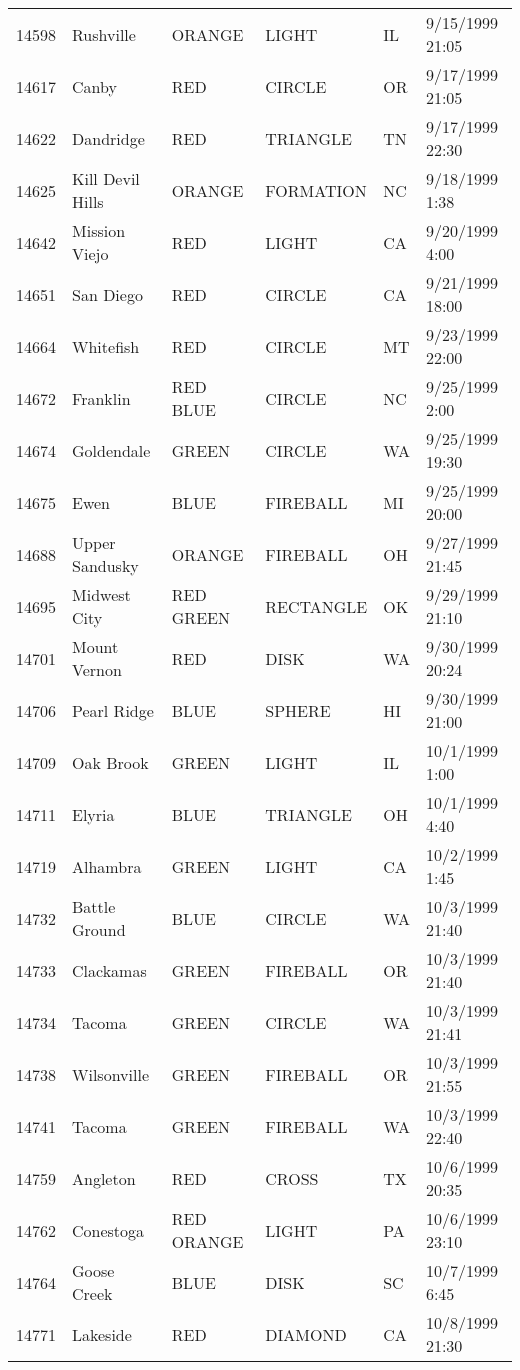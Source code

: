 \begin{tabular}{llllll}
14598 & Rushville & ORANGE & LIGHT & IL & 9/15/1999 21:05 \\
14617 & Canby & RED & CIRCLE & OR & 9/17/1999 21:05 \\
14622 & Dandridge & RED & TRIANGLE & TN & 9/17/1999 22:30 \\
14625 & Kill Devil Hills & ORANGE & FORMATION & NC & 9/18/1999 1:38 \\
14642 & Mission Viejo & RED & LIGHT & CA & 9/20/1999 4:00 \\
14651 & San Diego & RED & CIRCLE & CA & 9/21/1999 18:00 \\
14664 & Whitefish & RED & CIRCLE & MT & 9/23/1999 22:00 \\
14672 & Franklin & RED BLUE & CIRCLE & NC & 9/25/1999 2:00 \\
14674 & Goldendale & GREEN & CIRCLE & WA & 9/25/1999 19:30 \\
14675 & Ewen & BLUE & FIREBALL & MI & 9/25/1999 20:00 \\
14688 & Upper Sandusky & ORANGE & FIREBALL & OH & 9/27/1999 21:45 \\
14695 & Midwest City & RED GREEN & RECTANGLE & OK & 9/29/1999 21:10 \\
14701 & Mount Vernon & RED & DISK & WA & 9/30/1999 20:24 \\
14706 & Pearl Ridge & BLUE & SPHERE & HI & 9/30/1999 21:00 \\
14709 & Oak Brook & GREEN & LIGHT & IL & 10/1/1999 1:00 \\
14711 & Elyria & BLUE & TRIANGLE & OH & 10/1/1999 4:40 \\
14719 & Alhambra & GREEN & LIGHT & CA & 10/2/1999 1:45 \\
14732 & Battle Ground & BLUE & CIRCLE & WA & 10/3/1999 21:40 \\
14733 & Clackamas & GREEN & FIREBALL & OR & 10/3/1999 21:40 \\
14734 & Tacoma & GREEN & CIRCLE & WA & 10/3/1999 21:41 \\
14738 & Wilsonville & GREEN & FIREBALL & OR & 10/3/1999 21:55 \\
14741 & Tacoma & GREEN & FIREBALL & WA & 10/3/1999 22:40 \\
14759 & Angleton & RED & CROSS & TX & 10/6/1999 20:35 \\
14762 & Conestoga & RED ORANGE & LIGHT & PA & 10/6/1999 23:10 \\
14764 & Goose Creek & BLUE & DISK & SC & 10/7/1999 6:45 \\
14771 & Lakeside & RED & DIAMOND & CA & 10/8/1999 21:30 \\

\end{tabular}
